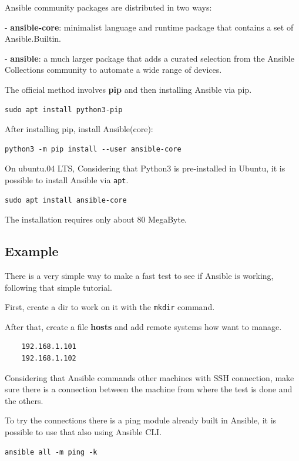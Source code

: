 \documentclass[12pt,a4paper,openright,twoside]{book}
\begin{document}
Ansible community packages are distributed in two ways:

- \textbf{ansible-core}: minimalist language and runtime package that contains a set of Ansible.Builtin.

- \textbf{ansible}: a much larger package that adds a curated selection from the Ansible Collections community to automate a wide range of devices.

The official method involves \textbf{pip} and then installing Ansible via pip.
\begin{lstlisting}
sudo apt install python3-pip
\end{lstlisting}

After installing pip, install Ansible(core):

\begin{lstlisting}
python3 -m pip install --user ansible-core
\end{lstlisting}

On ubuntu.04 LTS,
Considering that Python3 is pre-installed in Ubuntu, it is possible to install Ansible via \texttt{apt}.

\begin{lstlisting}
sudo apt install ansible-core
\end{lstlisting}

The installation requires only about 80 MegaByte.

\subsection{Example}

There is a very simple way to make a fast test to see if Ansible is working, following that simple tutorial\cite{ansibleRIP}.


First, create a dir to work on it with the \texttt{mkdir} command.


After that, create a file \textbf{hosts} and add remote systems how want to manage.
\begin{lstlisting}
    192.168.1.101
    192.168.1.102
\end{lstlisting}

Considering that Ansible commands other machines with SSH connection, make sure there is a connection between the machine from where the test is done and the others.

To try the connections there is a ping module already built in Ansible, it is possible to use that also using Ansible CLI.
\begin{lstlisting}
ansible all -m ping -k
\end{lstlisting}
\end{document}
